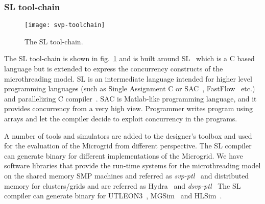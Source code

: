 \documentclass{article}
\begin{document}
\begin{figure}
\begin{minipage}{\textwidth}
\scriptsize
\lstset{float, language=C, caption=A snipper of the assembly program generated from the
microthreaded program of Matrix Multiplication for the Microgrid., label=code:assembly_matmul}

\end{minipage}
\end{figure}

\subsubsection*{SL tool-chain}

\begin{figure}

\begin{centering}

\texttt{[image: svp-toolchain]}

\caption{\label{fig:svp_toolchain}The SL tool-chain.}

\end{centering}

\end{figure}

The SL tool-chain is shown in fig.~\ref{fig:svp_toolchain} and is built around
SL~\cite{poss.12.sl} which is a C based language but is extended to express the
concurrency constructs of the microthreading model. SL is an intermediate
language intended for higher level programming languages (such as Single
Assignment C or
SAC~\cite{sac_tutorial:,grelck.09.cpc,GrelckJFP05,GrelSchoIJPP06,
Grelck:2007:SOS:1248648.1248654},
FastFlow~\cite{Aldinucci12fastflow:high-level,ff:distr:cgs:12} etc.) and
parallelizing C compiler~\cite{saougkos.09.cpc,saougkos.11}. SAC is Matlab-like
programming language, and it provides concurrency from a very high view.
Programmer writes program using arrays and let the compiler decide to exploit
concurrency in the programs.

A number of tools and simulators are added to the designer's toolbox and used
for the evaluation of the Microgrid from different perspective. The SL compiler
can generate binary for different implementations of the Microgrid. We have
software libraries that provide the run-time systems for the microthreading
model on the shared memory SMP machines and referred as
\emph{svp-ptl}~\cite{SVP-PTL2009} and distributed memory for clusters/grids and
are referred as Hydra~\cite{Andrei:msc_hydra:2010} and
\emph{dsvp-ptl}~\cite{DSVP-PTL2011} The SL compiler can generate binary for
UTLEON3~\cite{5491777,danek.12},
MGSim~\cite{Bousias:2009:IEM:1517865.1518255,poss.13.MGSim.SAMOS} and
HLSim~\cite{Irfan:multipe_levels_hlsim:2013, Irfan:oneipc_hlsim:2013,
Irfan.12.2013.signatures, Irfan.12.2013.CacheBased, Irfan.01.2014.analytical,
Irfan:hl_sim_ptl:2011, Irfan:msc_hlsim:2009, Uddin:2012:CSM:2162131.2162132}.
\end{document}
